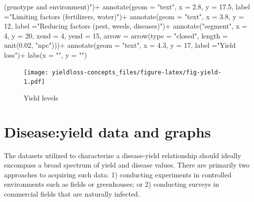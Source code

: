 \documentclass[
  letterpaper,
]{book}
\newenvironment{Shaded}{\begin{snugshade}}{\end{snugshade}}
\newcommand{\AttributeTok}[1]{\textcolor[rgb]{0.40,0.45,0.13}{#1}}
\newcommand{\DecValTok}[1]{\textcolor[rgb]{0.68,0.00,0.00}{#1}}
\newcommand{\FloatTok}[1]{\textcolor[rgb]{0.68,0.00,0.00}{#1}}
\newcommand{\FunctionTok}[1]{\textcolor[rgb]{0.28,0.35,0.67}{#1}}
\newcommand{\NormalTok}[1]{\textcolor[rgb]{0.00,0.23,0.31}{#1}}
\newcommand{\SpecialCharTok}[1]{\textcolor[rgb]{0.37,0.37,0.37}{#1}}
\newcommand{\StringTok}[1]{\textcolor[rgb]{0.13,0.47,0.30}{#1}}
\begin{document}
\begin{Shaded}
\begin{Highlighting}[]
\StringTok{           (genotype and environment)"}\NormalTok{)}\SpecialCharTok{+}
  \FunctionTok{annotate}\NormalTok{(}\AttributeTok{geom =} \StringTok{"text"}\NormalTok{, }\AttributeTok{x =} \FloatTok{2.8}\NormalTok{, }\AttributeTok{y =} \FloatTok{17.5}\NormalTok{, }\AttributeTok{label =}\StringTok{"Limiting factors}
\StringTok{        (fertilizers, water)"}\NormalTok{)}\SpecialCharTok{+}
  \FunctionTok{annotate}\NormalTok{(}\AttributeTok{geom =} \StringTok{"text"}\NormalTok{, }\AttributeTok{x =} \FloatTok{3.8}\NormalTok{, }\AttributeTok{y =} \DecValTok{12}\NormalTok{, }\AttributeTok{label =}\StringTok{"Reducing factors}
\StringTok{           (pest, weeds, diseases)"}\NormalTok{)}\SpecialCharTok{+}
  \FunctionTok{annotate}\NormalTok{(}\StringTok{"segment"}\NormalTok{, }\AttributeTok{x =} \DecValTok{4}\NormalTok{, }\AttributeTok{y =} \DecValTok{20}\NormalTok{, }\AttributeTok{xend =} \DecValTok{4}\NormalTok{, }\AttributeTok{yend =} \DecValTok{15}\NormalTok{,}
         \AttributeTok{arrow =} \FunctionTok{arrow}\NormalTok{(}\AttributeTok{type =} \StringTok{"closed"}\NormalTok{, }\AttributeTok{length =} \FunctionTok{unit}\NormalTok{(}\FloatTok{0.02}\NormalTok{, }\StringTok{"npc"}\NormalTok{)))}\SpecialCharTok{+}
  \FunctionTok{annotate}\NormalTok{(}\AttributeTok{geom =} \StringTok{"text"}\NormalTok{, }\AttributeTok{x =} \FloatTok{4.3}\NormalTok{, }\AttributeTok{y =} \DecValTok{17}\NormalTok{, }\AttributeTok{label =}\StringTok{"Yield loss"}\NormalTok{)}\SpecialCharTok{+}
  \FunctionTok{labs}\NormalTok{(}\AttributeTok{x =} \StringTok{""}\NormalTok{, }\AttributeTok{y =} \StringTok{""}\NormalTok{)}
\end{Highlighting}
\end{Shaded}

\begin{figure}

\texttt{[image: yieldloss-concepts\_files/figure-latex/fig-yield-1.pdf]} \hfill{}

\caption{\label{fig-yield}Yield levels}

\end{figure}

\hypertarget{diseaseyield-data-and-graphs}{%
\section{Disease:yield data and
graphs}\label{diseaseyield-data-and-graphs}}

The datasets utilized to characterize a disease-yield relationship
should ideally encompass a broad spectrum of yield and disease values.
There are primarily two approaches to acquiring such data: 1) conducting
experiments in controlled environments such as fields or greenhouses; or
2) conducting surveys in commercial fields that are naturally infected.
\end{document}
